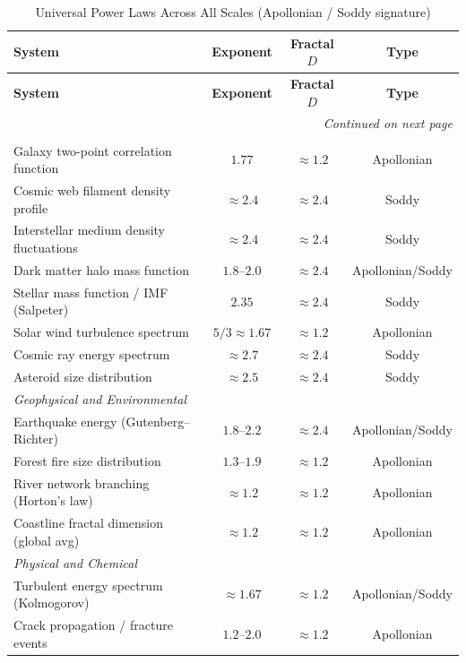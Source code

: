 \documentclass[11pt,a4paper]{article}
\begin{document}
\begin{longtable}{p{6.8cm}ccc}
\caption{Universal Power Laws Across All Scales (Apollonian / Soddy signature)} \\
\toprule
\textbf{System} & \textbf{Exponent} & \textbf{Fractal $D$} & \textbf{Type} \\
\midrule
\endfirsthead
\toprule
\textbf{System} & \textbf{Exponent} & \textbf{Fractal $D$} & \textbf{Type} \\
\midrule
\endhead
\midrule\multicolumn{4}{r}{\textit{Continued on next page}}\\\endfoot
\bottomrule\endlastfoot
\multicolumn{4}{l}{\textit{Astrophysical and Cosmological}} \\
\midrule
Galaxy two-point correlation function & $1.77$ & $\approx1.2$ & Apollonian \\
Cosmic web filament density profile & $\approx2.4$ & $\approx2.4$ & Soddy \\
Interstellar medium density fluctuations & $\approx2.4$ & $\approx2.4$ & Soddy \\
Dark matter halo mass function & $1.8$--$2.0$ & $\approx2.4$ & Apollonian/Soddy \\
Stellar mass function / IMF (Salpeter) & $2.35$ & $\approx2.4$ & Soddy \\
Solar wind turbulence spectrum & $5/3\approx1.67$ & $\approx1.2$ & Apollonian \\
Cosmic ray energy spectrum & $\approx2.7$ & $\approx2.4$ & Soddy \\
Asteroid size distribution & $\approx2.5$ & $\approx2.4$ & Soddy \\
\midrule
\multicolumn{4}{l}{\textit{Geophysical and Environmental}} \\
\midrule
Earthquake energy (Gutenberg--Richter) & $1.8$--$2.2$ & $\approx2.4$ & Apollonian/Soddy \\
Forest fire size distribution & $1.3$--$1.9$ & $\approx1.2$ & Apollonian \\
River network branching (Horton's law) & $\approx1.2$ & $\approx1.2$ & Apollonian \\
Coastline fractal dimension (global avg) & $\approx1.2$ & $\approx1.2$ & Apollonian \\
\midrule
\multicolumn{4}{l}{\textit{Physical and Chemical}} \\
\midrule
Turbulent energy spectrum (Kolmogorov) & $\approx1.67$ & $\approx1.2$ & Apollonian/Soddy \\
Crack propagation / fracture events & $1.2$--$2.0$ & $\approx1.2$ & Apollonian \\

\end{longtable}
\end{document}
